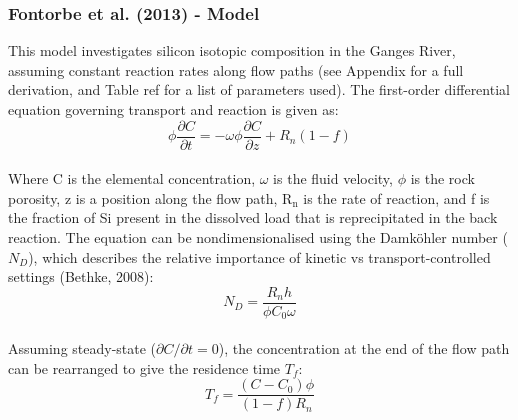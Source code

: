 \subsubsection*{Fontorbe et al. (2013) - Model}

This model investigates silicon isotopic composition in the Ganges River, assuming constant reaction rates along flow paths (see Appendix for a full derivation, and Table ref for a list of parameters used). The first-order differential equation governing transport and reaction is given as:\\

    \begin{equation}
    \phi \frac{\partial C}{\partial t} = -\omega \phi \frac{\partial C}{\partial z} + R_n(1-f)
    \end{equation}\\

Where C is the elemental concentration, $\omega$ is the fluid velocity, $\phi$ is the rock porosity, z is a position along the flow path, R$_\text{n}$ is the rate of reaction, and f is the fraction of Si present in the dissolved load that is reprecipitated in the back reaction. The equation can be nondimensionalised using the Damköhler number (\(N_D\)), which describes the relative importance of kinetic vs transport-controlled settings (Bethke, 2008):\\

\begin{equation}
    N_D = \frac{R_n h}{\phi C_0 \omega}
\end{equation}\\

Assuming steady-state (\(\partial C/\partial t = 0\)), the concentration at the end of the flow path can be rearranged to give the residence time \(T_f\):\\

\begin{equation}
    T_f = \frac{(C - C_0)\phi}{(1-f)R_n}
\end{equation}


